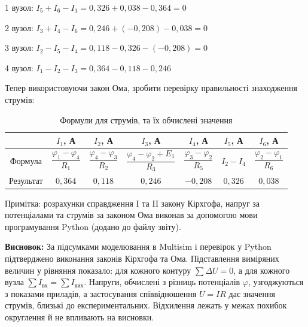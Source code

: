 \documentclass[12pt,a4paper]{article}
\begin{document}
    \vspace{1em}

    1 вузол: $I_5 + I_6 - I_1 = 0{,}326 + 0{,}038 - 0{,}364 = 0$

    \vspace{1em}

    2 вузол: $I_3 + I_4 - I_6 = 0{,}246 + (-0{,}208) - 0{,}038 = 0$

    \vspace{1em}

    3 вузол: $I_2 - I_5 - I_4 = 0{,}118 - 0{,}326 - (-0{,}208) = 0$

    \vspace{1em}

    4 вузол: $I_1 - I_2 - I_3 = 0{,}364 - 0{,}118 - 0{,}246$

    \vspace{1em}

    Тепер використовуючи закон Ома, зробити перевірку правильності знаходження струмів:

    \begin{table}[h!]
        \centering
        \renewcommand{\arraystretch}{1.2}
        \begin{tabular}{|c|c|c|c|c|c|c|}
            \hline
            & $I_1$, А & $I_2$, А & $I_3$, А & $I_4$, А & $I_5$, А & $I_6$, А \\
            \hline
            Формула &
            $\dfrac{\varphi_1-\varphi_4}{R_1}$ &
            $\dfrac{\varphi_4-\varphi_3}{R_2}$ &
            $\dfrac{\varphi_4-\varphi_2 + E_1}{R_3}$ &
            $\dfrac{\varphi_3-\varphi_2}{R_5}$ &
            $I_2 - I_4$ &
            $\dfrac{\varphi_2-\varphi_1}{R_6}$ \\
            \hline
            Результат &
            $0{,}364$ & $0{,}118$ & $0{,}246$ & $-0{,}208$ & $0{,}326$ & $0{,}038$ \\
            \hline
        \end{tabular}
        \caption{Формули для струмів, та їх обчислені значення}
    \end{table}

    \setlength{\parindent}{0em}

    Примітка: розрахунки справдження I та II закону Кірхгофа, напруг за потенціалами та струмів за законом Ома виконав за допомогою мови програмування Python (додано до файлу звіту).

    \vspace{1em}

    \textbf{Висновок:} За підсумками моделювання в Multisim і перевірок у Python підтверджено виконання законів Кірхгофа та Ома. 
    Підставлення виміряних величин у рівняння показало: для кожного контуру $\sum \Delta U = 0$, а для кожного вузла $\sum I_{\text{вх}}=\sum I_{\text{вих}}$. 
    Напруги, обчислені з різниць потенціалів $\varphi$, узгоджуються з показами приладів, а застосування співвідношення $U=IR$ дає значення струмів, близькі до експериментальних. 
    Відхилення лежать у межах похибок округлення й не впливають на висновки.
\end{document}
